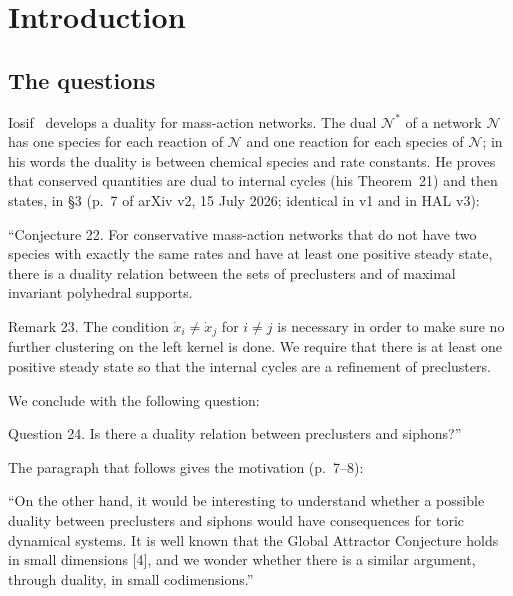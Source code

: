 \documentclass[11pt,a4paper]{report}
\newcommand{\Net}{\mathcal{N}}
\newcommand{\Nd}{\mathcal{N}^{*}}
\begin{document}
\section{Introduction}\label{sec:intro}

\subsection{The questions}

Iosif~\autocite{Iosif2026} develops a duality for mass-action networks. The dual \(\Nd\) of a network \(\Net\) has one
species for each reaction of \(\Net\) and one reaction for each species of \(\Net\); in his words the duality is
between chemical species and rate constants. He proves that conserved quantities are dual to internal cycles (his
Theorem~21) and then states, in §3 (p.~7 of arXiv v2, 15 July 2026; identical in v1 and in HAL v3):

\begin{openquote}
``Conjecture 22. For conservative mass-action networks that do not have two species with exactly the same rates and
have at least one positive steady state, there is a duality relation between the sets of preclusters and of maximal
invariant polyhedral supports.

Remark 23. The condition \(\dot x_i\neq\dot x_j\) for \(i\neq j\) is necessary in order to make sure no further
clustering on the left kernel is done. We require that there is at least one positive steady state so that the
internal cycles are a refinement of preclusters.

We conclude with the following question:

Question 24. Is there a duality relation between preclusters and siphons?''
\end{openquote}

The paragraph that follows gives the motivation (p.~7--8):

\begin{openquote}
``On the other hand, it would be interesting to understand whether a possible duality between preclusters and
siphons would have consequences for toric dynamical systems. It is well known that the Global Attractor Conjecture
holds in small dimensions [4], and we wonder whether there is a similar argument, through duality, in small
codimensions.''
\end{openquote}
\end{document}
